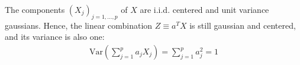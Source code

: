 

The components $(X_j)_{j=1,\ldots,p}$ of $X$ are i.i.d. centered and unit variance 
gaussians. Hence, the linear combination $Z \equiv a^T X$ is still gaussian and 
centered, and its variance is also one:
\begin{eqnarray}
\textrm{Var}\left(\sum_{j=1}^p a_j X_j \right) = \sum_{j=1}^p a_j^2 = 1
\end{eqnarray}